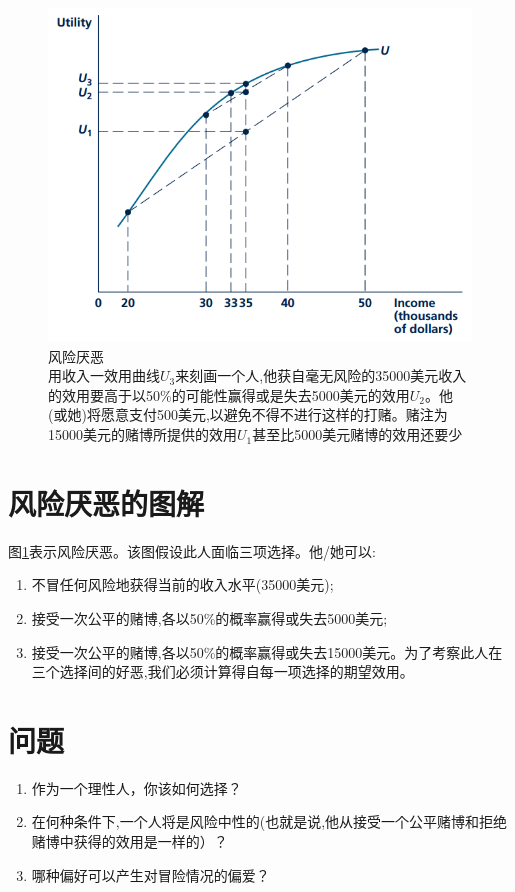 \documentclass[10pt, a4paper]{ctexart} %
\begin{document}
\begin{figure}[ht]
	\centering
	\includegraphics[scale=1]{fig//risk.png} %
	\caption{风险厌恶\\	用收入一效用曲线$U_3$来刻画一个人,他获自毫无风险的35000美元收入的效用要高于以50\%的可能性赢得或是失去5000美元的效用$U_2$。他(或她)将愿意支付500美元,以避免不得不进行这样的打赌。赌注为15000美元的赌博所提供的效用$U_1$甚至比5000美元赌博的效用还要少} %
	\label{risk} %
\end{figure}

\section*{风险厌恶的图解}
图\ref{risk}表示风险厌恶。该图假设此人面临三项选择。他/她可以:
\begin{enumerate}
  \item 不冒任何风险地获得当前的收入水平(35000美元);
  \item 接受一次公平的赌博,各以50\%的概率赢得或失去5000美元;
  \item 接受一次公平的赌博,各以50\%的概率赢得或失去15000美元。为了考察此人在三个选择间的好恶,我们必须计算得自每一项选择的期望效用。
\end{enumerate}



\section*{问题}
\begin{enumerate}
	\item 作为一个理性人，你该如何选择？
	\item 在何种条件下,一个人将是风险中性的(也就是说,他从接受一个公平赌博和拒绝赌博中获得的效用是一样的）？
	\item 哪种偏好可以产生对冒险情况的偏爱？	
\end{enumerate}
\end{document}
